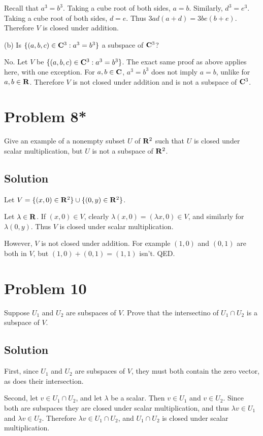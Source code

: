 \documentclass{article}
\begin{document}
Recall that $a^3=b^3$. Taking a cube root of both sides, $a=b$. Similarly, $d^3=e^3$. Taking a cube root of both sides, $d=e$. Thus $3ad(a+d)=3be(b+e)$. Therefore $V$ is closed under addition.

\vs

(b) \qquad Is $\{(a, b, c)\in\mathbf{C}^3:a^3=b^3\}$ a subspace of $\mathbf{C}^3$?

No. Let $V$ be $\{(a, b, c)\in\mathbf{C}^3:a^3=b^3\}$. The exact same proof as above applies here, with one exception. For $a,b\in\mathbf{C}$, $a^3=b^3$ does not imply $a=b$, unlike for $a,b\in\mathbf{R}$. Therefore $V$ is not closed under addition and is not a subspace of $\mathbf{C}^3$.

\section*{Problem 8*}
Give an example of a nonempty subset $U$ of $\mathbf{R}^2$ such that $U$ is closed under scalar multiplication, but $U$ is not a subspace of $\mathbf{R}^2$.

\subsection*{Solution}
Let $V=\{(x, 0)\in\mathbf{R}^2 \}\cup\{(0, y)\in\mathbf{R}^2 \}$.

\vs

Let $\lambda\in\mathbf{R}$. If $(x,0)\in V$, clearly $\lambda(x, 0)=(\lambda x, 0)\in V$, and similarly for $\lambda(0, y)$. Thus $V$ is closed under scalar multiplication.

\vs

However, $V$ is not closed under addition. For example $(1, 0)$ and $(0, 1)$ are both in $V$, but $(1,0)+(0,1)=(1, 1)$ isn't. QED.

\section*{Problem 10}
Suppose $U_1$ and $U_2$ are subspaces of $V$. Prove that the intersectino of $U_1\cap U_2$ is a subspace of $V$.

\subsection*{Solution}

First, since $U_1$ and $U_2$ are subspaces of $V$, they must both contain the zero vector, as does their intersection.

\vs

Second, let $v\in U_1\cap U_2$, and let $\lambda$ be a scalar. Then $v\in U_1$ and $v\in U_2$. Since both are subspaces they are closed under scalar multiplication, and thus $\lambda v\in U_1$ and $\lambda v\in U_2$. Therefore $\lambda v \in U_1\cap U_2$, and $U_1\cap U_2$ is closed under scalar multiplication.
\end{document}
